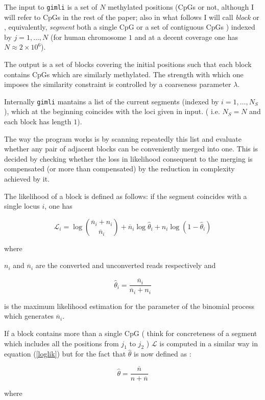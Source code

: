 \documentclass[12pt]{amsart}
\newcommand{\lik}{\ensuremath{\mathcal{L}}}
\begin{document}
The  input to \texttt{gimli} is a set of $N$ methylated positions 
(CpGs or not, although I will refer to CpGs in the rest of the paper; also in what
follows I will call {\em block} or ,
equivalently, {\em segment}
both a single CpG or a set of contiguous CpGs ) indexed by $j=1,\dots,N$ 
(for human chromosome $1$ and at a 
decent coverage one has $N \approx 2\times 10^6$).

The output is a set of blocks 
covering the initial positions 
such that each block contains CpGs which are similarly
methylated. The strength with which
one imposes the similarity constraint
is controlled by a coarseness parameter $\lambda$.

Internally \texttt{gimli} mantains a list of the current  
segments (indexed by $i=1,\dots,N_S$), 
which at the beginning 
coincides with the loci given in input. 
( i.e.  $N_S=N$ and each block has length $1$). 

The way the program works is by 
scanning repeatedly this list and evaluate whether any pair 
of adjacent blocks can be conveniently merged into one.  
This is decided by checking whether the loss in 
likelihood consequent to the merging is compensated 
(or more than compensated)
by the reduction in complexity achieved by it.

The likelihood of a block is defined as follows: if the
segment coincides with a single locus $i$, one has

\begin{equation}
\lik_i=\log {\overline{n}_i+n_i \choose \overline{n}_i} +
	{\overline{n}_i}\log\hat{\theta}_i+
	n_i\log(1-\hat{\theta}_i)
\end{equation}
\label{loglik}

where

$n_i$ and $\overline{n}_i$ are the converted and unconverted reads respectively 
and

\[\hat{\theta}_i=\frac{\overline{n}_i}{\overline{n}_i+n_i}\]

is the maximum likelihood estimation for the parameter of the binomial process 
which generates $\overline{n}_i$.

If a block contains  more than a single CpG  
( think for concreteness of a segment which includes all the positions from 
$j_1$ to $j_2$ ) $\lik$ is 
computed in a similar way in equation (\ref{loglik}) but for the fact that $\hat{\theta}$ is now
defined as :

\[
\hat{\theta}=\frac{\overline{n}}{n + \overline{n}}
\]

where
\end{document}
